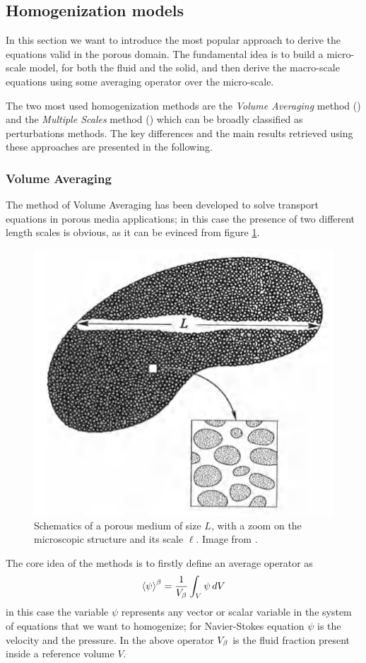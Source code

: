 \subsection{Homogenization models}

In this section we want to introduce the most popular approach to derive the equations valid in the porous domain.
The fundamental idea is to build a micro-scale model, for both the fluid and the solid, and then derive the macro-scale equations using some averaging operator over the micro-scale.

The two most used homogenization methods are the \textit{Volume Averaging} method (\citet{whitaker2013method}) and the \textit{Multiple Scales} method (\citet{mei2010homogenization}) which can be broadly classified as perturbations methods. 
The key differences and the main results retrieved using these approaches are presented in the following.


\subsubsection{Volume Averaging}
\label{sec:vans}

The method of Volume Averaging has been developed to solve transport equations in porous media applications; in this case the presence of two different length scales is obvious, as it can be evinced from figure \ref{fig:porsystem}.
	
	\begin{figure}[h]
		\centering
		\includegraphics[width=0.5\linewidth]{chapter_1/por_system}
		\caption{Schematics of a porous medium of size $L$, with a zoom on the microscopic structure and its scale $\ell$. Image from \citet{whitaker2013method}.}
		\label{fig:porsystem}
	\end{figure}

The core idea of the methods is to firstly define an average operator as $${\left< \psi \right>}^{\beta} = \dfrac{1}{V_\beta} \displaystyle\int_{V} \psi \, dV$$ in this case the variable $\psi$ represents any vector or scalar variable in the system of equations that we want to homogenize; for Navier-Stokes equation $\psi$ is the velocity and the pressure. In the above operator $V_\beta$ is the fluid fraction present inside a reference volume $V$.

